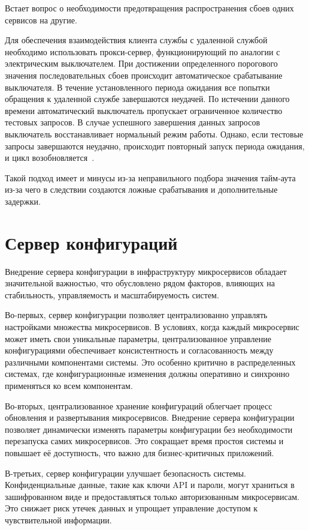 Встает вопрос о необходимости предотвращения распространения сбоев одних сервисов на другие.

Для обеспечения взаимодействия клиента службы с удаленной службой необходимо использовать
прокси-сервер, функционирующий по аналогии с электрическим выключателем.
При достижении
определенного порогового значения последовательных сбоев происходит автоматическое срабатывание
выключателя.
В течение установленного периода ожидания все попытки обращения к удаленной службе
завершаются неудачей.
По истечении данного времени автоматический выключатель пропускает
ограниченное количество тестовых запросов.
В случае успешного завершения данных запросов выключатель
восстанавливает нормальный режим работы.
Однако, если тестовые запросы завершаются неудачно,
происходит повторный запуск периода ожидания, и цикл
возобновляется~\cite{microservice_pattern}.

Такой подход имеет и минусы из-за неправильного подбора значения тайм-аута из-за чего в следствии
создаются ложные срабатывания и дополнительные задержки.


\section{Сервер конфигураций}

Внедрение сервера конфигурации в инфраструктуру микросервисов обладает значительной важностью, что обусловлено рядом
факторов, влияющих на стабильность, управляемость и масштабируемость систем.

Во-первых, сервер конфигурации позволяет централизованно управлять настройками множества микросервисов.
В условиях,
когда каждый микросервис может иметь свои уникальные параметры, централизованное управление конфигурациями обеспечивает
консистентность и согласованность между различными компонентами системы.
Это особенно критично в распределенных
системах, где конфигурационные изменения должны оперативно и синхронно применяться ко всем компонентам.

Во-вторых, централизованное хранение конфигураций облегчает процесс обновления и развертывания микросервисов.
Внедрение
сервера конфигурации позволяет динамически изменять параметры конфигурации без необходимости перезапуска самих
микросервисов.
Это сокращает время простоя системы и повышает её доступность, что важно для бизнес-критичных приложений.

В-третьих, сервер конфигурации улучшает безопасность системы.
Конфиденциальные данные, такие как ключи API и пароли,
могут храниться в зашифрованном виде и предоставляться только авторизованным микросервисам.
Это снижает риск утечек
данных и упрощает управление доступом к чувствительной информации.

